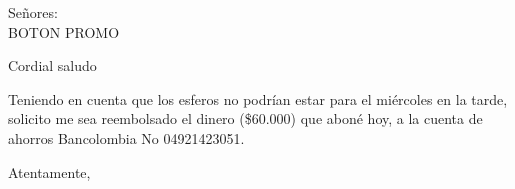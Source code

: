 \documentclass[letterpaper,spanish]{letter}
\begin{document}
\begin{letter}{Señores:\\BOTON PROMO}
	
\opening{Cordial saludo}
Teniendo en cuenta que los esferos no podrían estar para el miércoles en la tarde, solicito me sea reembolsado el dinero (\$60.000) que aboné hoy, a la cuenta de ahorros Bancolombia No 04921423051.

\closing{Atentamente,}


\end{letter}
\end{document}
